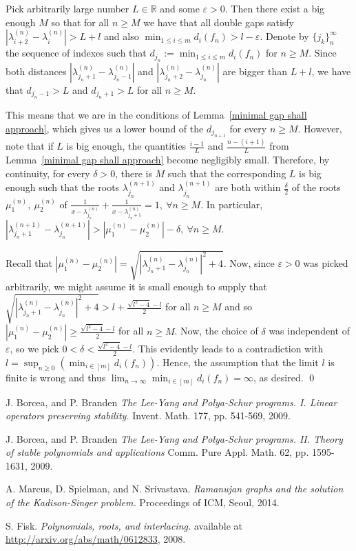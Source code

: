 \documentclass[11pt]{article}
\begin{document}
Pick arbitrarily large number $L\in\mathbb{R}$ and some $\varepsilon > 0$. Then there exist a big enough $M$ so that for all $n\geq M$ we have that all double gaps satisfy $|\lambda^{(n)}_{i+2} - \lambda^{(n)}_i| > L + l$ and also $\min_{1\leq i \leq m} d_i (f_n)> l - \varepsilon$. Denote by $\{j_k\}_{n}^{\infty}$ the sequence of indexes such that $d_{j_n}:=\min_{1\leq i \leq m} d_i (f_n)$ for $n\geq M$. Since both distances $|\lambda^{(n)}_{j_n+1} - \lambda^{(n)}_{j_n-1}|$ and $|\lambda^{(n)}_{j_n+2} - \lambda^{(n)}_{j_n}|$ are bigger than $L + l$, we have that $d_{j_n-1}> L$ and $d_{j_n+1} > L$ for all $n\geq M$.

This means that we are in the conditions of Lemma~\ref{minimal gap shall approach}, which gives us a lower bound of the $d_{j_{n+1}}$ for every $n\geq M$. However, note that if $L$ is big enough, the quantities $\frac{i-1}{L}$ and $\frac{n-(i+1)}{L}$ from Lemma~\ref{minimal gap shall approach} become negligibly small. Therefore, by continuity, for every $\delta > 0$, there is $M$ such that the corresponding $L$ is big enough such that the roots $\lambda^{(n+1)}_{j_n}$ and $\lambda^{(n+1)}_{j_n}$ are both within $\frac{\delta}{2}$ of the roots $\mu^{(n)}_1,~\mu^{(n)}_2$ of $\frac{1}{x-\lambda^{(n)}_{j_n}} + \frac{1}{x-\lambda^{(n)}_{j_n+1}} = 1,~\forall n\geq M$. In particular, $|\lambda^{(n+1)}_{j_n+1} - \lambda^{(n+1)}_{j_n}|>|\mu^{(n)}_1 - \mu^{(n)}_2| - \delta,~\forall n\geq M$.

Recall that $|\mu^{(n)}_1 - \mu^{(n)}_2|= \sqrt{|\lambda^{(n)}_{j_n+1} - \lambda^{(n)}_{j_n}|^2 + 4}$. Now, since $\varepsilon > 0$ was picked arbitrarily, we might assume it is small enough to supply that $\sqrt{|\lambda^{(n)}_{j_n+1} - \lambda^{(n)}_{j_n}|^2 + 4} >l + \frac{\sqrt{l^2 -4} - l}{2}$ for all $n\ge M$ and so $|\mu^{(n)}_1 - \mu^{(n)}_2|\ge \frac{\sqrt{l^2 -4} - l}{2}$ for all $n\ge M$. Now, the choice of $\delta$ was independent of $\varepsilon$, so we pick $0< \delta <\frac{\sqrt{l^2 -4} - l}{2}$. This evidently leads to a contradiction with $l = \sup_{n\ge 0} (\min_{i \in [m]} d_i (f_n))$. Hence, the assumption that the limit $l$ is finite is wrong and thus $\lim_{n\to\infty} \min_{i \in [m]} d_i (f_n) = \infty$, as desired. \qed

\begin{thebibliography}{1}

   J. Borcea, and P. Branden {\em The Lee-Yang and Polya-Schur programs. I. Linear operators preserving stability.} Invent. Math. 177, pp. 541-569, 2009.

  J. Borcea, and P. Branden {\em The Lee-Yang and Polya-Schur programs. II. Theory of stable polynomials and applications} Comm. Pure Appl. Math. 62, pp. 1595-1631, 2009.

    A. Marcus, D. Spielman, and N. Srivastava. {\em Ramanujan graphs and the solution of the Kadison-Singer problem.} Proceedings of ICM, Seoul, 2014.

    S. Fisk. {\em Polynomials, roots, and interlacing.} available at \url{http://arxiv.org/abs/math/0612833}, 2008.
  \end{thebibliography}
\end{document}
